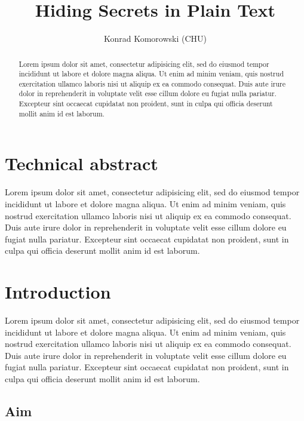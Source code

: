 \documentclass[draft]{IIBproject}
\begin{document}
\thispagestyle{empty}
\author{Konrad Komorowski (CHU)}
\title{Hiding Secrets in Plain Text}
\maketitle

\clearpage
\pagestyle{plain}
\section*{Technical abstract}

Lorem ipsum dolor sit amet, consectetur adipisicing elit, sed do eiusmod tempor incididunt ut labore et dolore magna aliqua. Ut enim ad minim veniam, quis nostrud exercitation ullamco laboris nisi ut aliquip ex ea commodo consequat. Duis aute irure dolor in reprehenderit in voluptate velit esse cillum dolore eu fugiat nulla pariatur. Excepteur sint occaecat cupidatat non proident, sunt in culpa qui officia deserunt mollit anim id est laborum.

\clearpage
\pagestyle{empty}
\begin{abstract}
Lorem ipsum dolor sit amet, consectetur adipisicing elit, sed do eiusmod tempor incididunt ut labore et dolore magna aliqua. Ut enim ad minim veniam, quis nostrud exercitation ullamco laboris nisi ut aliquip ex ea commodo consequat. Duis aute irure dolor in reprehenderit in voluptate velit esse cillum dolore eu fugiat nulla pariatur. Excepteur sint occaecat cupidatat non proident, sunt in culpa qui officia deserunt mollit anim id est laborum.
\end{abstract}
\tableofcontents

\clearpage
\pagestyle{plain}
\section{Introduction}

Lorem ipsum dolor sit amet, consectetur adipisicing elit, sed do eiusmod tempor incididunt ut labore et dolore magna aliqua. Ut enim ad minim veniam, quis nostrud exercitation ullamco laboris nisi ut aliquip ex ea commodo consequat. Duis aute irure dolor in reprehenderit in voluptate velit esse cillum dolore eu fugiat nulla pariatur. Excepteur sint occaecat cupidatat non proident, sunt in culpa qui officia deserunt mollit anim id est laborum.

\FloatBarrier
\subsection{Aim}
\end{document}
